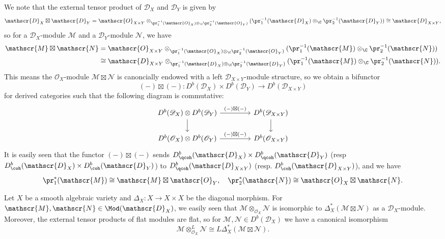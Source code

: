 We note that the external tensor product of $\mathscr{D}_X$ and $\mathscr{D}_Y$ is given by
\[\mathscr{D}_X\boxtimes\mathscr{D}_Y=\mathscr{O}_{X\times Y}\otimes_{\pr_1^{-1}(\mathscr{O}_X)\otimes_{\C}\pr_2^{-1}(\mathscr{O}_Y)}(\pr_1^{-1}(\mathscr{D}_X)\otimes_{\C}\pr_2^{-1}(\mathscr{D}_Y))\cong\mathscr{D}_{X\times Y},\]
so for a $\mathscr{D}_X$-module $\mathscr{M}$ and a $\mathscr{D}_Y$-module $\mathscr{N}$, we have
\begin{align*}
\mathscr{M}\boxtimes\mathscr{N}&=\mathscr{O}_{X\times Y}\otimes_{\pr_1^{-1}(\mathscr{O}_X)\otimes_{\C}\pr_2^{-1}(\mathscr{O}_Y)}(\pr_1^{-1}(\mathscr{M})\otimes_\C\pr_2^{-1}(\mathscr{N}))\\
&\cong \mathscr{D}_{X\times Y}\otimes_{\pr_1^{-1}(\mathscr{D}_X)\otimes_{\C}\pr_2^{-1}(\mathscr{D}_Y)}(\pr_1^{-1}(\mathscr{M})\otimes_\C\pr_2^{-1}(\mathscr{N})).
\end{align*}
This means the $\mathscr{O}_X$-module $\mathscr{M}\boxtimes\mathscr{N}$ is canoncially endowed with a left $\mathscr{D}_{X\times Y}$-module structure, so we obtain a bifunctor
\[(-)\boxtimes(-):D^b(\mathscr{D}_X)\times D^b(\mathscr{D}_Y)\to D^b(\mathscr{D}_{X\times Y})\]
for derived categories such that the following diagram is commutative:
\[\begin{tikzcd}[column sep=15mm]
D^b(\mathscr{D}_X)\otimes D^b(\mathscr{D}_Y)\ar[d]\ar[r,"(-)\boxtimes(-)"]&D^b(\mathscr{D}_{X\times Y})\ar[d]\\
D^b(\mathscr{O}_X)\otimes D^b(\mathscr{O}_Y)\ar[r,"(-)\boxtimes(-)"]&D^b(\mathscr{O}_{X\times Y})
\end{tikzcd}\]
It is easily seen that the functor $(-)\boxtimes(-)$ sends $D^b_{\qcoh}(\mathscr{D}_X)\times D^b_{\qcoh}(\mathscr{D}_Y)$ (resp $D^b_{\coh}(\mathscr{D}_X)\times D^b_{\coh}(\mathscr{D}_Y)$) to $D^b_{\qcoh}(\mathscr{D}_{X\times Y})$ (resp. $D^b_{\coh}(\mathscr{D}_{X\times Y})$), and we have
\[\pr_1^*(\mathscr{M})\cong\mathscr{M}\boxtimes\mathscr{O}_Y,\quad \pr_2^*(\mathscr{N})\cong \mathscr{O}_X\boxtimes\mathscr{N}.\]

Let $X$ be a smooth algebraic variety and $\Delta_X:X\to X\times X$ be the diagonal morphism. For $\mathscr{M},\mathscr{N}\in\Mod(\mathscr{D}_X)$, we easily seen that $\mathscr{M}\otimes_{\mathscr{O}_X}\mathscr{N}$ is isomorphic to $\Delta_X^*(\mathscr{M}\boxtimes\mathscr{N})$ as a $\mathscr{D}_X$-module. Moreover, the external tensor products of flat modules are flat, so for $\mathscr{M},\mathscr{N}\in D^b(\mathscr{D}_X)$ we have a canonical isomorphism
\[\mathscr{M}\otimes_{\mathscr{O}_X}^L\mathscr{N}\cong L\Delta_X^*(\mathscr{M}\boxtimes\mathscr{N}).\]

